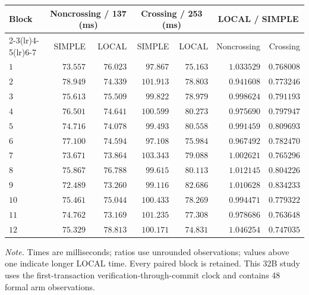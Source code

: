 \begingroup
\fontsize{8.7}{10.5}\selectfont
\setlength{\tabcolsep}{3.5pt}\renewcommand{\arraystretch}{1.03}
\noindent
\begin{tabular*}{\linewidth}{@{\extracolsep{\fill}}lrrrrrr@{}}
\toprule
Block & \multicolumn{2}{c}{Noncrossing / 137 (ms)} & \multicolumn{2}{c}{Crossing / 253 (ms)} & \multicolumn{2}{c}{LOCAL / SIMPLE}\\
\cmidrule(lr){2-3}\cmidrule(lr){4-5}\cmidrule(lr){6-7}
 & SIMPLE & LOCAL & SIMPLE & LOCAL & Noncrossing & Crossing\\
\midrule
$1$ & $73.557$ & $76.023$ & $97.867$ & $75.163$ & $1.033529$ & $0.768008$\\
$2$ & $78.949$ & $74.339$ & $101.913$ & $78.803$ & $0.941608$ & $0.773246$\\
$3$ & $75.613$ & $75.509$ & $99.822$ & $78.979$ & $0.998624$ & $0.791193$\\
$4$ & $76.501$ & $74.641$ & $100.599$ & $80.273$ & $0.975690$ & $0.797947$\\
\addlinespace[2.5pt]
$5$ & $74.716$ & $74.078$ & $99.493$ & $80.558$ & $0.991459$ & $0.809693$\\
$6$ & $77.100$ & $74.594$ & $97.108$ & $75.984$ & $0.967492$ & $0.782470$\\
$7$ & $73.671$ & $73.864$ & $103.343$ & $79.088$ & $1.002621$ & $0.765296$\\
$8$ & $75.867$ & $76.788$ & $99.615$ & $80.113$ & $1.012145$ & $0.804226$\\
\addlinespace[2.5pt]
$9$ & $72.489$ & $73.260$ & $99.116$ & $82.686$ & $1.010628$ & $0.834233$\\
$10$ & $75.461$ & $75.044$ & $100.433$ & $78.269$ & $0.994471$ & $0.779322$\\
$11$ & $74.762$ & $73.169$ & $101.235$ & $77.308$ & $0.978686$ & $0.763648$\\
$12$ & $75.329$ & $78.813$ & $100.171$ & $74.831$ & $1.046254$ & $0.747035$\\
\bottomrule
\end{tabular*}
\par\smallskip
\fontsize{8}{9.6}\selectfont\raggedright
\textit{Note.} Times are milliseconds; ratios use unrounded observations; values above one indicate longer LOCAL time. Every paired block is retained. This 32B study uses the first-transaction verification-through-commit clock and contains 48 formal arm observations.
\par\endgroup
